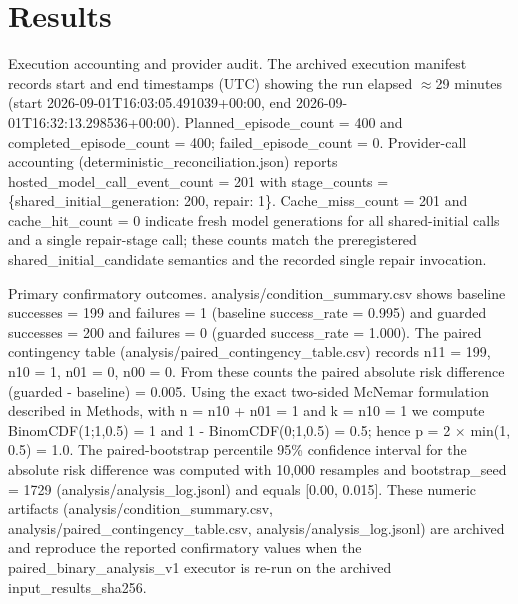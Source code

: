 \documentclass[conference]{IEEEtran}
\begin{document}
\section{Results}
Execution accounting and provider audit. The archived execution manifest records start and end timestamps (UTC) showing the run elapsed \ensuremath{\approx}29 minutes (start 2026-09-01T16:03:05.491039+00:00, end 2026-09-01T16:32:13.298536+00:00). Planned\_episode\_count = 400 and completed\_episode\_count = 400; failed\_episode\_count = 0. Provider-call accounting (deterministic\_reconciliation.json) reports hosted\_model\_call\_event\_count = 201 with stage\_counts = \{shared\_initial\_generation: 200, repair: 1\}. Cache\_miss\_count = 201 and cache\_hit\_count = 0 indicate fresh model generations for all shared-initial calls and a single repair-stage call; these counts match the preregistered shared\_initial\_candidate semantics and the recorded single repair invocation.

Primary confirmatory outcomes. analysis/condition\_summary.csv shows baseline successes = 199 and failures = 1 (baseline success\_rate = 0.995) and guarded successes = 200 and failures = 0 (guarded success\_rate = 1.000). The paired contingency table (analysis/paired\_contingency\_table.csv) records n11 = 199, n10 = 1, n01 = 0, n00 = 0. From these counts the paired absolute risk difference (guarded - baseline) = 0.005. Using the exact two-sided McNemar formulation described in Methods, with n = n10 + n01 = 1 and k = n10 = 1 we compute BinomCDF(1;1,0.5) = 1 and 1 - BinomCDF(0;1,0.5) = 0.5; hence p = 2 \ensuremath{\times} min(1, 0.5) = 1.0. The paired-bootstrap percentile 95\% confidence interval for the absolute risk difference was computed with 10,000 resamples and bootstrap\_seed = 1729 (analysis/analysis\_log.jsonl) and equals [0.00, 0.015]. These numeric artifacts (analysis/condition\_summary.csv, analysis/paired\_contingency\_table.csv, analysis/analysis\_log.jsonl) are archived and reproduce the reported confirmatory values when the paired\_binary\_analysis\_v1 executor is re-run on the archived input\_results\_sha256.
\end{document}
